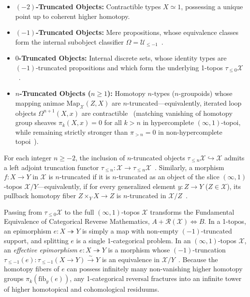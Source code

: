 \begin{itemize}

  \item \textbf{$(-2)$-Truncated Objects:} Contractible types $X \simeq 1$, possessing a unique point up to coherent higher homotopy.

  \item \textbf{$(-1)$-Truncated Objects:} Mere propositions, whose equivalence classes form the internal subobject classifier $\Omega = \mathcal{U}_{\le -1}$~\cite[\S 6.1.6]{Lurie09}.

  \item \textbf{$0$-Truncated Objects:} Internal discrete sets, whose identity types are $(-1)$-truncated propositions and which form the underlying 1-topos $\tau_{\le 0}\mathcal{X}$~\cite[\S 6.4.5]{Lurie09}.

  \item \textbf{$n$-Truncated Objects ($n \ge 1$):} Homotopy $n$-types ($n$-groupoids) whose mapping animae $\mathrm{Map}_{\mathcal{X}}(Z, X)$ are $n$-truncated---equivalently, iterated loop objects $\Omega^{n+1}(X, x)$ are contractible~\cite[Prop.~5.5.6.5]{Lurie09} (matching vanishing of homotopy group sheaves $\pi_k(X, x) = 0$ for all $k > n$ in hypercomplete $(\infty, 1)$-topoi, while remaining strictly stronger than $\pi_{>n} = 0$ in non-hypercomplete topoi~\cite[\S 6.5.2]{Lurie09}).

\end{itemize}

For each integer $n \ge -2$, the inclusion of $n$-truncated objects $\tau_{\le n}\mathcal{X} \hookrightarrow \mathcal{X}$ admits a left adjoint truncation functor $\tau_{\le n}: \mathcal{X} \to \tau_{\le n}\mathcal{X}$~\cite[Prop.~5.5.6.18]{Lurie09}. Similarly, a morphism $f: X \to Y$ in $\mathcal{X}$ is $n$-truncated if it is $n$-truncated as an object of the slice $(\infty, 1)$-topos $\mathcal{X}/Y$---equivalently, if for every generalized element $y : Z \to Y$ ($Z \in \mathcal{X}$), its pullback homotopy fiber $Z \times_Y X \to Z$ is $n$-truncated in $\mathcal{X}/Z$~\cite[Prop.~5.5.6.18]{Lurie09}.

Passing from $\tau_{\le 0}\mathcal{X}$ to the full $(\infty, 1)$-topos $\mathcal{X}$ transforms the Fundamental Equivalence of Categorical Reverse Mathematics, $A + \mathcal{R}(\mathcal{X}) \iff B$. In a 1-topos, an epimorphism $e: X \twoheadrightarrow Y$ is simply a map with non-empty $(-1)$-truncated support, and splitting $e$ is a single 1-categorical problem. In an $(\infty, 1)$-topos $\mathcal{X}$, an \emph{effective epimorphism} $e: X \twoheadrightarrow Y$ is a morphism whose $(-1)$-truncation $\tau_{\le -1}(e): \tau_{\le -1}(X \to Y) \xrightarrow{\sim} Y$ is an equivalence in $\mathcal{X}/Y$~\cite[\S 6.2.3, Prop.~7.2.1.14]{Lurie09}. Because the homotopy fibers of $e$ can possess infinitely many non-vanishing higher homotopy groups $\pi_k(\mathrm{fib}_y(e))$, any 1-categorical reversal fractures into an infinite tower of higher homotopical and cohomological residuums.

